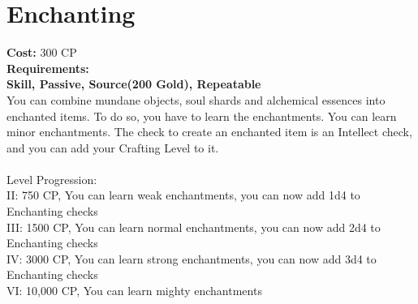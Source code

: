 \section{Enchanting}\label{perk:enchanting}
\textbf{Cost:} 300 CP\\
\textbf{Requirements:} ~\\
\textbf{Skill, Passive, Source(200 Gold), Repeatable}\\
You can combine mundane objects, soul shards and alchemical essences into enchanted items.
To do so, you have to learn the enchantments.
You can learn minor enchantments.
The check to create an enchanted item is an Intellect check, and you can add your Crafting Level to it.\\
\\
Level Progression:\\
II: 750 CP, You can learn weak enchantments, you can now add 1d4 to Enchanting checks\\
III: 1500 CP, You can learn normal enchantments, you can now add 2d4 to Enchanting checks\\
IV: 3000 CP, You can learn strong enchantments, you can now add 3d4 to Enchanting checks\\
VI: 10,000 CP, You can learn mighty enchantments\\